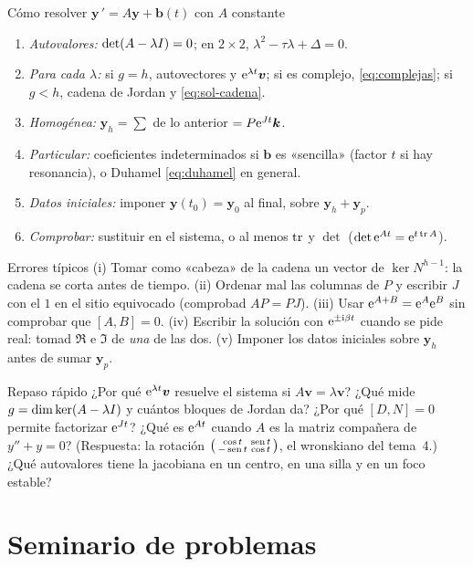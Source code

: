 \documentclass[11pt,twoside]{article}
\newcommand\vy{\bm{y}}
\newcommand\vb{\bm{b}}
\newcommand\vv{\bm{v}}
\newcommand\vk{\bm{k}}
\newcommand\smat[1]{\left(\begin{smallmatrix}#1\end{smallmatrix}\right)}
\begin{document}
\begin{metodo}{Cómo resolver $\vy\,'=A\vy+\vb(t)$ con $A$ constante}
\begin{enumerate}
\item \emph{Autovalores:} $\det(A-\lambda I)=0$; en $2\times2$, $\lambda^2-\tau\lambda+\Delta=0$.
\item \emph{Para cada $\lambda$:} si $g=h$, autovectores y $\e^{\lambda t}\vv$; si es complejo, \eqref{eq:complejas};
si $g<h$, cadena de Jordan y \eqref{eq:sol-cadena}.
\item \emph{Homogénea:} $\vy_h=\sum$ de lo anterior $=P\e^{Jt}\vk$.
\item \emph{Particular:} coeficientes indeterminados si $\vb$ es «sencilla» (factor $t$ si hay resonancia), o Duhamel
\eqref{eq:duhamel} en general.
\item \emph{Datos iniciales:} imponer $\vy(t_0)=\vy_0$ al final, sobre $\vy_h+\vy_p$.
\item \emph{Comprobar:} sustituir en el sistema, o al menos $\operatorname{tr}$ y $\det$ ($\det\mathrm{e}^{At}=\mathrm{e}^{t\operatorname{tr} A}$).
\end{enumerate}
\end{metodo}

\begin{nota}{Errores típicos}
(i) Tomar como «cabeza» de la cadena un vector de $\ker N^{h-1}$: la cadena se corta antes de tiempo.
(ii) Ordenar mal las columnas de $P$ y escribir $J$ con el $1$ en el sitio equivocado (comprobad $AP=PJ$).
(iii) Usar $\mathrm{e}^{A+B}=\mathrm{e}^A\mathrm{e}^B$ sin comprobar que $[A,B]=0$.
(iv) Escribir la solución con $\mathrm{e}^{\pm\mathrm{i}\beta t}$ cuando se pide real: tomad $\Re$ e $\Im$ de \emph{una} de las dos.
(v) Imponer los datos iniciales sobre $\vy_h$ antes de sumar $\vy_p$.
\end{nota}

\begin{consejo}{Repaso rápido}
¿Por qué $\e^{\lambda t}\vv$ resuelve el sistema si $A\vv=\lambda\vv$? ¿Qué mide $g=\dim\ker(A-\lambda I)$ y cuántos
bloques de Jordan da? ¿Por qué $[D,N]=0$ permite factorizar $\mathrm{e}^{Jt}$? ¿Qué es $\mathrm{e}^{At}$ cuando $A$ es la matriz
compañera de $y''+y=0$? (Respuesta: la rotación $\smat{\cos t&\sen t\\-\sen t&\cos t}$, el wronskiano del tema~4.)
¿Qué autovalores tiene la jacobiana en un centro, en una silla y en un foco estable?
\end{consejo}

\section{Seminario de problemas}\label{sec:seminario}
\end{document}
